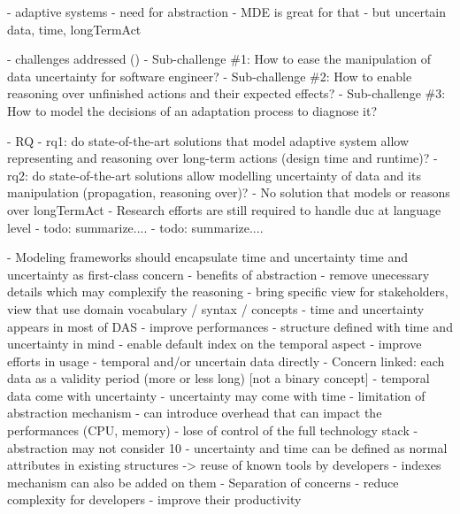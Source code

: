 - adaptive systems
- need for abstraction
- MDE is great for that
- but uncertain data, time, \gls{longTermAct}

- challenges addressed ()
	- Sub-challenge \#1: How to ease the manipulation of data uncertainty for software engineer?
	- Sub-challenge \#2: How to enable reasoning over unfinished actions and their expected effects?
	- Sub-challenge \#3: How to model the decisions of an adaptation process to diagnose it?
	

- RQ
	- rq1: do state-of-the-art solutions that model adaptive system allow representing and reasoning over long-term actions
(design time and runtime)?
	- rq2: do state-of-the-art solutions allow modelling uncertainty of data and its manipulation (propagation, reasoning over)?
- No solution that models or reasons over \gls{longTermAct}
- Research efforts are still required to handle \gls{duc} at language level
- todo: summarize....
- todo: summarize....

- Modeling frameworks should encapsulate time and uncertainty time and uncertainty as first-class concern
- benefits of abstraction
    - remove unecessary details which may complexify the reasoning
    - bring specific view for stakeholders, view that use domain vocabulary / syntax / concepts
- time and uncertainty appears in most of DAS
- improve performances
    - structure defined with time and uncertainty in mind
        - enable default index on the temporal aspect
- improve efforts in usage
    - temporal and/or uncertain data directly 
- Concern linked: each data as a validity period (more or less long) [not a binary concept]
    - temporal data come with uncertainty
    - uncertainty may come with time
- limitation of abstraction mechanism
    - can introduce overhead that can impact the performances (CPU, memory)
    - lose of control of the full technology stack
    - abstraction may not consider 10%
- uncertainty and time can be defined as normal attributes in existing structures -> reuse of known tools by developers
    - indexes mechanism can also be added on them
- Separation of concerns
    - reduce complexity for developers
    - improve their productivity



